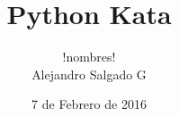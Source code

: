 \documentclass{beamer}
\begin{document}
    \title{Python Kata}
    \author{!nombres! \\
            Alejandro Salgado G}
    \date{7 de Febrero de 2016}

    \frame{ \titlepage }

    
\end{document}
